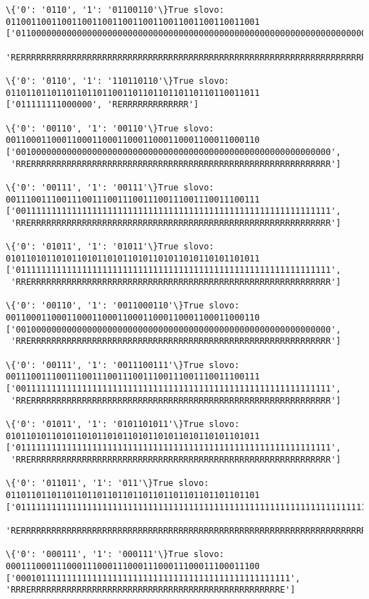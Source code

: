 \documentclass{article}
\begin{document}
\begin{Verbatim}[commandchars=\\\{\}]
\{'0': '0110', '1': '01100110'\}True slovo: 01100110011001100110011001100110011001100110011001
['01100000000000000000000000000000000000000000000000000000000000000000000000000',
 'RERRRRRRRRRRRRRRRRRRRRRRRRRRRRRRRRRRRRRRRRRRRRRRRRRRRRRRRRRRRRRRRRRRRRRRRRRRR']

\{'0': '0110', '1': '110110110'\}True slovo: 01101101101101101101100110110110110110110110011011
['011111111000000', 'RERRRRRRRRRRRRR']

\{'0': '00110', '1': '00110'\}True slovo: 00110001100011000110001100011000110001100011000110
['00100000000000000000000000000000000000000000000000000000000000',
 'RRERRRRRRRRRRRRRRRRRRRRRRRRRRRRRRRRRRRRRRRRRRRRRRRRRRRRRRRRRRR']

\{'0': '00111', '1': '00111'\}True slovo: 00111001110011100111001110011100111001110011100111
['00111111111111111111111111111111111111111111111111111111111111',
 'RRERRRRRRRRRRRRRRRRRRRRRRRRRRRRRRRRRRRRRRRRRRRRRRRRRRRRRRRRRRR']

\{'0': '01011', '1': '01011'\}True slovo: 01011010110101101011010110101101011010110101101011
['01111111111111111111111111111111111111111111111111111111111111',
 'RRERRRRRRRRRRRRRRRRRRRRRRRRRRRRRRRRRRRRRRRRRRRRRRRRRRRRRRRRRRR']

\{'0': '00110', '1': '0011000110'\}True slovo: 00110001100011000110001100011000110001100011000110
['00100000000000000000000000000000000000000000000000000000000000',
 'RRERRRRRRRRRRRRRRRRRRRRRRRRRRRRRRRRRRRRRRRRRRRRRRRRRRRRRRRRRRR']

\{'0': '00111', '1': '0011100111'\}True slovo: 00111001110011100111001110011100111001110011100111
['00111111111111111111111111111111111111111111111111111111111111',
 'RRERRRRRRRRRRRRRRRRRRRRRRRRRRRRRRRRRRRRRRRRRRRRRRRRRRRRRRRRRRR']

\{'0': '01011', '1': '0101101011'\}True slovo: 01011010110101101011010110101101011010110101101011
['01111111111111111111111111111111111111111111111111111111111111',
 'RRERRRRRRRRRRRRRRRRRRRRRRRRRRRRRRRRRRRRRRRRRRRRRRRRRRRRRRRRRRR']

\{'0': '011011', '1': '011'\}True slovo: 01101101101101101101101101101101101101101101101101
['01111111111111111111111111111111111111111111111111111111111111111111111111111111111111111111111111111',
 'RERRRRRRRRRRRRRRRRRRRRRRRRRRRRRRRRRRRRRRRRRRRRRRRRRRRRRRRRRRRRRRRRRRRRRRRRRRRRRRRRRRRRRRRRRRRRRRRRRRR']

\{'0': '000111', '1': '000111'\}True slovo: 00011100011100011100011100011100011100011100011100
['000101111111111111111111111111111111111111111111111111', 
'RRRERRRRRRRRRRRRRRRRRRRRRRRRRRRRRRRRRRRRRRRRRRRRRRRRRE']


\end{Verbatim}
\end{document}
